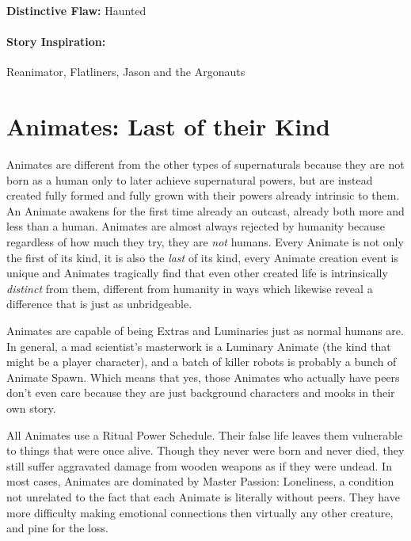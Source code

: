 \textbf{Distinctive Flaw:} Haunted

\paragraph{Story Inspiration:} Reanimator, Flatliners, Jason and the Argonauts

\section[Animates]{Animates: Last of their Kind} 

Animates are different from the other types of supernaturals because they are not born as a human only to later achieve supernatural powers, but are instead created fully formed and fully grown with their powers already intrinsic to them. An Animate awakens for the first time already an outcast, already both more and less than a human. Animates are almost always rejected by humanity because regardless of how much they try, they are \textit{not} humans. Every Animate is not only the first of its kind, it is also the \textit{last} of its kind, every Animate creation event is unique and Animates tragically find that even other created life is intrinsically \textit{distinct} from them, different from humanity in ways which likewise reveal a difference that is just as unbridgeable.

Animates are capable of being Extras and Luminaries just as normal humans are. In general, a mad scientist's masterwork is a Luminary Animate (the kind that might be a player character), and a batch of killer robots is probably a bunch of Animate Spawn. Which means that yes, those Animates who actually have peers don't even care because they are just background characters and mooks in their own story.

All Animates use a Ritual Power Schedule. Their false life leaves them vulnerable to things that were once alive. Though they never were born and never died, they still suffer aggravated damage from wooden weapons as if they were undead. In most cases, Animates are dominated by Master Passion: Loneliness, a condition not unrelated to the fact that each Animate is literally without peers. They have more difficulty making emotional connections then virtually any other creature, and pine for the loss.

